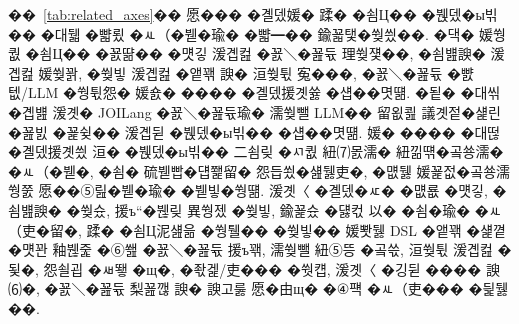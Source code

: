\documentclass[10pt,twocolumn]{article}
\begin{document}
��~\ref{tab:related_axes}�� 愿��� �곌뎄媛� 蹂� �쇰Ц�� �붽뎄�ы빆�� �대뒓 �뺣룄 �ㅻ（�붿�瑜� �뺣━�� 鍮꾧탳�쒖씠��. �댁� 媛쒕퀎 �쇰Ц�� �꾨땲�� �먯깋 湲곕컲 �꾨＼�꾪듃 理쒖쟻��, �쇰뱶諛� 湲곕컲 媛쒖꽑, �쒖빟 湲곕컲 �앹꽦 諛� 洹쒖튃 寃���, �꾨＼�꾪듃 �뺤텞/LLM �쒕튃怨� 媛숈� ���� �곌뎄援곗쓣 �섑��몃떎. �됱� �대씪�곕뱶 湲곗� JOILang �꾨＼�꾪듃瑜� 濡쒖뺄 LLM�� 留욊쾶 議곗젙�섍린 �꾪빐 �꾩슂�� 湲곕뒫 �붽뎄�ы빆�� �섑��몃떎. 媛� ���� �대떦 �곌뎄援곗씠 洹� �붽뎄�ы빆�� 二쇰맂 �ㅺ퀎 紐⑺몴濡� 紐낆떆�곸쑝濡� �ㅻ（�붿�, �쇰� 硫붿빱�덉쬁留� 怨듭쑀�섎뒗吏�, �먮뒗 媛꾩젒�곸쑝濡쒕쭔 愿��⑤릺�붿�瑜� �붿빟�쒕떎. 湲곗〈 �곌뎄�ㅼ� �먮룞 �먯깋, �쇰뱶諛� �쒖슜, 援ъ“�붾맂 異쒕젰 �쒖빟, 鍮꾩슜 �덇컧 以� �쇰�瑜� �ㅻ（吏�留�, 蹂� �쇰Ц泥섎읆 �쒕퉬�� �쒖빟�� 媛뽯뒗 DSL �앹꽦 �섍꼍�먯꽌 釉붾줉 �⑥쐞 �꾨＼�꾪듃 援ъ꽦, 濡쒖뺄 紐⑤뜽 �곸쓳, 洹쒖튃 湲곕컲 �됯�, 怨쇨굅 �ㅽ뙣 �щ�, �좏겙/吏��� �쒓컙, 湲곗〈 �깅뒫 ���� 諛⑹�, �꾨＼�꾪듃 梨꾪깮 諛� 諛고룷 愿�由щ� �④퍡 �ㅻ（吏��� �딅뒗��.
\end{document}
